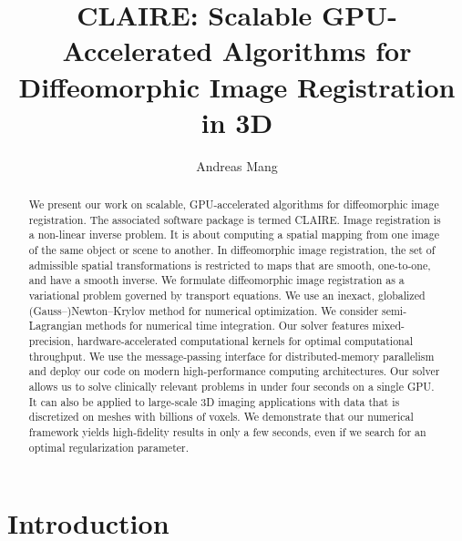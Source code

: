 \documentclass[11pt]{amsart}
\title[CLAIRE: GPU-Accelerated Algorithms for Diffeomorphic Image Registration]{CLAIRE: Scalable GPU-Accelerated Algorithms for Diffeomorphic Image Registration in 3D}
\author{Andreas Mang}
\begin{document}
\maketitle

\begin{abstract}
We present our work on scalable, GPU-accelerated algorithms for diffeomorphic image registration. The associated software package is termed CLAIRE. Image registration is a non-linear inverse problem. It is about computing a spatial mapping from one image of the same object or scene to another. In diffeomorphic image registration, the set of admissible spatial transformations is restricted to maps that are smooth, one-to-one, and have a smooth inverse. We formulate diffeomorphic image registration as a variational problem governed by transport equations. We use an inexact, globalized (Gauss--)Newton--Krylov method for numerical optimization. We consider semi-Lagrangian methods for numerical time integration. Our solver features mixed-precision, hardware-accelerated computational kernels for optimal computational throughput. We use the message-passing interface for distributed-memory parallelism and deploy our code on modern high-performance computing architectures. Our solver allows us to solve clinically relevant problems in under four seconds on a single GPU. It can also be applied to large-scale 3D imaging applications with data that is discretized on meshes with billions of voxels. We demonstrate that our numerical framework yields high-fidelity results in only a few seconds, even if we search for an optimal regularization parameter.
\end{abstract}




\section{Introduction}
\label{s:intro}
\end{document}
